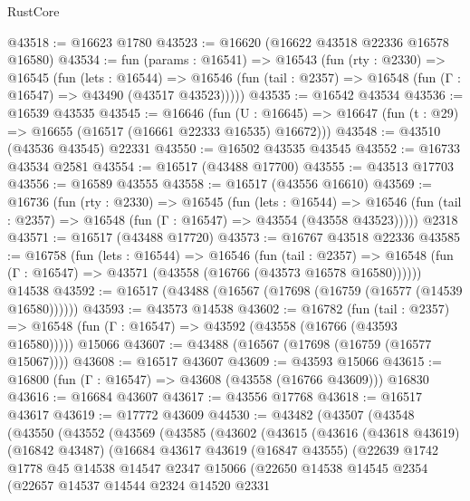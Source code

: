 \begin{lexlean}{RustCore}
\begin{coremodule}
@43518 := @16623 @1780
@43523 := @16620 (@16622 @43518 @22336 @16578 @16580)
@43534 := fun (params : @16541) =>
  @16543
    (fun (rty : @2330) =>
    @16545
      (fun (lets : @16544) =>
      @16546 (fun (tail : @2357) => @16548 (fun (Γ : @16547) => @43490 (@43517 @43523)))))
@43535 := @16542 @43534
@43536 := @16539 @43535
@43545 := @16646
    (fun (U : @16645) => @16647 (fun (t : @29) => @16655 (@16517 (@16661 @22333 @16535) @16672)))
@43548 := @43510 (@43536 @43545) @22331
@43550 := @16502 @43535 @43545
@43552 := @16733 @43534 @2581
@43554 := @16517 (@43488 @17700)
@43555 := @43513 @17703
@43556 := @16589 @43555
@43558 := @16517 (@43556 @16610)
@43569 := @16736
    (fun (rty : @2330) =>
    @16545
      (fun (lets : @16544) =>
      @16546 (fun (tail : @2357) => @16548 (fun (Γ : @16547) => @43554 (@43558 @43523)))))
    @2318
@43571 := @16517 (@43488 @17720)
@43573 := @16767 @43518 @22336
@43585 := @16758
    (fun (lets : @16544) =>
    @16546
      (fun (tail : @2357) =>
      @16548 (fun (Γ : @16547) => @43571 (@43558 (@16766 (@43573 @16578 @16580))))))
    @14538
@43592 := @16517 (@43488 (@16567 (@17698 (@16759 (@16577 (@14539 @16580))))))
@43593 := @43573 @14538
@43602 := @16782
    (fun (tail : @2357) => @16548 (fun (Γ : @16547) => @43592 (@43558 (@16766 (@43593 @16580)))))
    @15066
@43607 := @43488 (@16567 (@17698 (@16759 (@16577 @15067))))
@43608 := @16517 @43607
@43609 := @43593 @15066
@43615 := @16800 (fun (Γ : @16547) => @43608 (@43558 (@16766 @43609))) @16830
@43616 := @16684 @43607
@43617 := @43556 @17768
@43618 := @16517 @43617
@43619 := @17772 @43609
@44530 := @43482
    (@43507
      (@43548
        (@43550
          (@43552
            (@43569
              (@43585
                (@43602
                  (@43615
                    (@43616
                      (@43618 @43619)
                      (@16842 @43487)
                      (@16684
                        @43617
                        @43619
                        (@16847 @43555)
                        (@22639
                          @1742
                          @1778
                          @45
                          @14538
                          @14547
                          @2347
                          @15066
                          (@22650
                            @14538
                            @14545
                            @2354
                            (@22657
                              @14537
                              @14544
                              @2324
                              @14520
                              @2331

\end{coremodule}
\end{lexlean}
